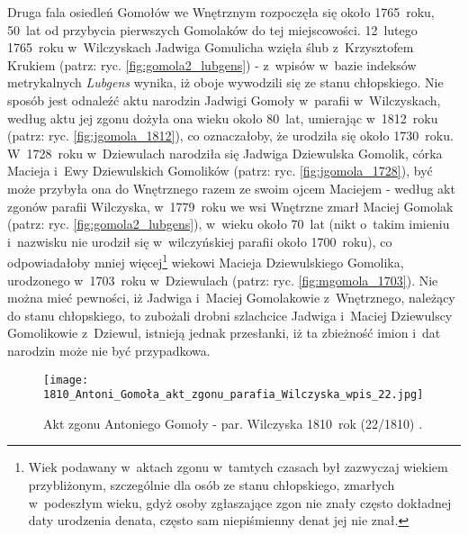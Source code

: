 Druga fala osiedleń Gomołów we Wnętrznym rozpoczęła się około 1765~roku,
50~lat od przybycia pierwszych Gomolaków do tej miejscowości. 12~lutego 
1765~roku w~Wilczyskach Jadwiga Gomulicha wzięła ślub z~Krzysztofem Krukiem 
(patrz: ryc. \ref{fig:gomola2_lubgens}) - z~wpisów w~bazie indeksów 
metrykalnych \emph{Lubgens} wynika, iż oboje wywodzili się ze stanu 
chłopskiego. Nie sposób jest odnaleźć aktu narodzin Jadwigi Gomoły w~parafii 
w~Wilczyskach, według aktu jej zgonu dożyła ona wieku około 80~lat, umierając 
w~1812~roku (patrz: ryc. \ref{fig:jgomola_1812}), co oznaczałoby, że urodziła 
się około 1730~roku. W~1728~roku w~Dziewulach narodziła się Jadwiga 
Dziewulska Gomolik, córka Macieja i~Ewy Dziewulskich Gomolików (patrz: ryc. 
\ref{fig:jgomola_1728}), być może przybyła ona do Wnętrznego razem ze swoim 
ojcem Maciejem - według akt zgonów parafii Wilczyska, w~1779~roku we wsi 
Wnętrzne zmarł Maciej Gomolak (patrz: ryc. \ref{fig:gomola2_lubgens}), 
w~wieku około 70~lat (nikt o~takim imieniu i~nazwisku nie urodził się 
w~wilczyńskiej parafii około 1700~roku), co odpowiadałoby mniej 
więcej\footnote{Wiek podawany w~aktach zgonu w~tamtych czasach był zazwyczaj 
wiekiem przybliżonym, szczególnie dla osób ze stanu chłopskiego, zmarłych 
w~podeszłym wieku, gdyż osoby zgłaszające zgon nie znały często dokładnej 
daty urodzenia denata, często sam niepiśmienny denat jej nie znał.} wiekowi 
Macieja Dziewulskiego Gomolika, urodzonego w~1703~roku w~Dziewulach (patrz: 
ryc. \ref{fig:mgomola_1703}). Nie można mieć pewności, iż Jadwiga i~Maciej 
Gomolakowie z~Wnętrznego, należący do stanu chłopskiego, to zubożali drobni 
szlachcice Jadwiga i~Maciej Dziewulscy Gomolikowie z~Dziewul, istnieją jednak 
przesłanki, iż ta zbieżność imion i~dat narodzin może nie być przypadkowa.

\begin{figure}[!ht]
    \vspace*{0.5cm}
    \centering \texttt{[image: 
        1810\_Antoni\_Gomoła\_akt\_zgonu\_parafia\_Wilczyska\_wpis\_22.jpg]}
    \captionsetup{format=hang}
    \caption{Akt zgonu Antoniego Gomoły - par. Wilczyska 1810~rok (22/1810) 
    \cite{par_wilczyska1}.}
    \label{fig:agomola}
\end{figure}

